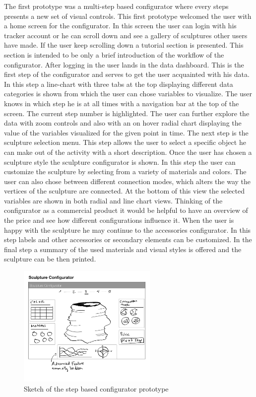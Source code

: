 \documentclass[../medieninformatik-arbeit.tex]{subfiles}
\begin{document}
The first prototype was a multi-step based configurator where every steps presents a new set of visual controls. This first prototype welcomed the user with a home screen for the configurator. In this screen the user can login with his tracker account or he can scroll down and see a gallery of sculptures other users have made. If the user keep scrolling down a tutorial section is presented. This section is intended to be only a brief introduction of the workflow of the configurator. After logging in the user lands in the data dashboard. This is the first step of the configurator and serves to get the user acquainted with his data. In this step a line-chart with three tabs at the top displaying different data categories is shown from which the user can chose variables to visualize. The user knows in which step he is at all times with a navigation bar at the top of the screen. The current step number is highlighted. The user can further explore the data with zoom controls and also with an on hover radial chart displaying the value of the variables visualized for the given point in time. The next step is the sculpture selection menu. This step allows the user to select a specific object he can make out of the activity with a short description. Once the user has chosen a sculpture style the sculpture configurator is shown. In this step the user can customize the sculpture by selecting from a variety of materials and colors. The user can also chose between different connection modes, which alters the way the vertices of the sculpture are connected. At the bottom of this view the selected variables are shown in both radial and line chart views. Thinking of the configurator as a commercial product it would be helpful to have an overview of the price and see how different configurations influence it. When the user is happy with the sculpture he may continue to the accessories configurator. In this step labels and other accessories or secondary elements can be customized. In the final step a summary of the used materials and visual styles is offered and the sculpture can be then printed. 

\begin{figure}[h]
\captionsetup{width=0.7\textwidth}
\begin{center}
  \includegraphics[width=0.6\textwidth,trim=0mm 24mm 0mm 0mm,clip=true]{Prototype/img/ui_proto1}
  \caption{Sketch of the step based configurator prototype}
\label{fig:uiproto1}
\end{center}
\end{figure}
\end{document}
